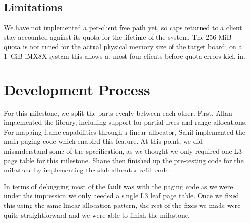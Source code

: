 \subsection{Limitations}

We have not implemented a per-client free path yet, so caps returned to a
client stay accounted against its quota for the lifetime of the system.
The 256 MiB quota is
not tuned for the actual physical memory size of the target board; on a
1~GiB iMX8X system this allows at most four clients before quota errors
kick in.

\section{Development Process}

For this milestone, we split the parts evenly between each other. First, Allan
implemented the  library, including support for partial frees and 
range allocations. For mapping frame capabilities through a linear allocator, Sahil implemented the
main paging code which enabled this feature. At this point, we did misunderstand
some of the specification, as we thought we only required one L3 page table for 
this milestone.  Shane then finished up the pre-testing code for the milestone by implementing the 
slab allocator refill code.

\medskip\noindent
In terms of debugging most of the fault was with the paging code as we were under the impression
we only needed a single L3 leaf page table. Once we fixed this using the same linear allocation
pattern, the rest of the fixes we made were quite straightforward and we were able to finish the
milestone.
